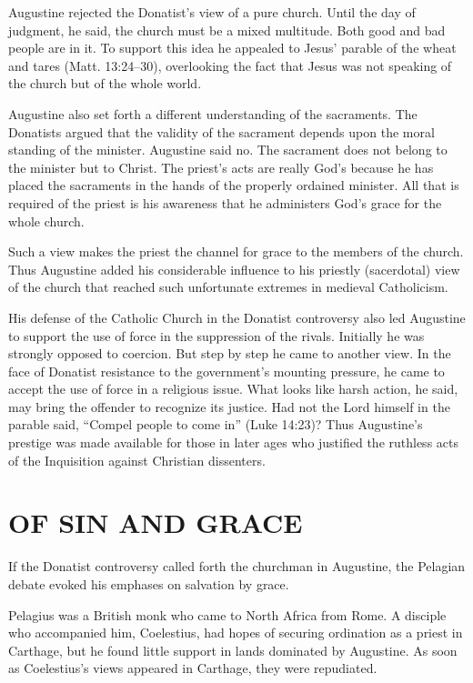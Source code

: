 Augustine rejected the Donatist’s view of a pure church. Until the day of judgment, he said, the
church must be a mixed multitude. Both good and bad people are in it. To support this idea he
appealed to Jesus’ parable of the wheat and tares (Matt. 13:24–30), overlooking the fact that Jesus
was not speaking of the church but of the whole world.

Augustine also set forth a different understanding of the sacraments. The Donatists argued that the
validity of the sacrament depends upon the moral standing of the minister. Augustine said no. The
sacrament does not belong to the minister but to Christ. The priest’s acts are really God’s because
he has placed the sacraments in the hands of the properly ordained minister. All that is required of
the priest is his awareness that he administers God’s grace for the whole church.

Such a view makes the priest the channel for grace to the members of the church. Thus Augustine
added his considerable influence to his priestly (sacerdotal) view of the church that reached such
unfortunate extremes in medieval Catholicism.

His defense of the Catholic Church in the Donatist controversy also led Augustine to support the use
of force in the suppression of the rivals. Initially he was strongly opposed to coercion. But step
by step he came to another view. In the face of Donatist resistance to the government’s mounting
pressure, he came to accept the use of force in a religious issue. What looks like harsh action, he
said, may bring the offender to recognize its justice. Had not the Lord himself in the parable said,
“Compel people to come in” (Luke 14:23)? Thus Augustine’s prestige was made available for those in
later ages who justified the ruthless acts of the Inquisition against Christian dissenters.

\section{OF SIN AND GRACE}

If the Donatist controversy called forth the churchman in Augustine, the Pelagian debate evoked his
emphases on salvation by grace.

Pelagius was a British monk who came to North Africa from Rome. A disciple who accompanied him,
Coelestius, had hopes of securing ordination as a priest in Carthage, but he found little support in
lands dominated by Augustine. As soon as Coelestius’s views appeared in Carthage, they were
repudiated.

